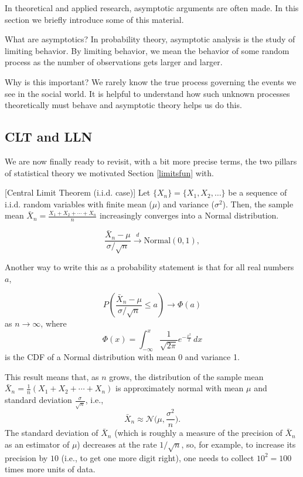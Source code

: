 \documentclass[]{book}
\theoremstyle{definition}
\theoremstyle{definition}
\theoremstyle{definition}
\theoremstyle{remark}
\begin{document}
In theoretical and applied research, asymptotic arguments are often made. In this section we briefly introduce some of this material.

What are asymptotics? In probability theory, asymptotic analysis is the study of limiting behavior. By limiting behavior, we mean the behavior of some random process as the number of observations gets larger and larger.

Why is this important? We rarely know the true process governing the events we see in the social world. It is helpful to understand how such unknown processes theoretically must behave and asymptotic theory helps us do this.

\hypertarget{clt-and-lln}{%
\subsection{CLT and LLN}\label{clt-and-lln}}

We are now finally ready to revisit, with a bit more precise terms, the two pillars of statistical theory we motivated Section \ref{limitsfun} with.

[Central Limit Theorem (i.i.d. case)]
\protect\hypertarget{thm:clt}{}{\label{thm:clt} {} }Let \(\{X_n\} = \{X_1, X_2, \ldots\}\) be a sequence of i.i.d. random variables with finite mean (\(\mu\)) and variance (\(\sigma^2\)). Then, the sample mean \(\bar{X}_n = \frac{X_1 + X_2 + \cdots + X_n}{n}\) increasingly converges into a Normal distribution.

\[\frac{\bar{X}_n - \mu}{\sigma / \sqrt{n}} \xrightarrow{d} \text{Normal}(0, 1),\]

Another way to write this as a probability statement is that for all real numbers \(a\),

\[P\left(\frac{\bar{X}_n - \mu}{\sigma/\sqrt{n}} \le a\right) \rightarrow \Phi(a)\]
as \(n\to \infty\), where \[\Phi(x) = \int_{-\infty}^x \frac{1}{\sqrt{2\pi}}e^{-\frac{x^2}{2}} \, dx\] is the CDF of a Normal distribution with mean 0 and variance 1.

This result means that, as \(n\) grows, the distribution of the sample mean \(\bar X_n = \frac{1}{n} (X_1 + X_2 + \cdots + X_n)\) is approximately normal with mean \(\mu\) and standard deviation \(\frac{\sigma}{\sqrt n}\), i.e.,
\[\bar{X}_n \approx \mathcal{N}\bigg(\mu, \frac{\sigma^2}{n}\bigg).\] The standard deviation of \(\bar X_n\) (which is roughly a measure of the precision of \(\bar X_n\) as an estimator of \(\mu\)) decreases at the rate \(1/\sqrt{n}\), so, for example, to increase its precision by \(10\) (i.e., to get one more digit right), one needs to collect \(10^2=100\) times more units of data.
\end{document}
